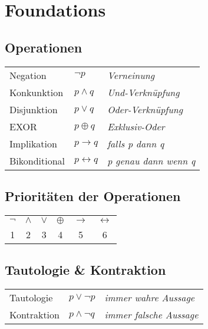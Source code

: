 \section{Foundations}

\subsection{Operationen}
\begin{tabular}{lll}
	Negation & $\neg p$ & \textit{Verneinung} \\ 
	Konkunktion & $p \wedge q$ & \textit{Und-Verknüpfung} \\ 
	Disjunktion & $p \vee q$ & \textit{Oder-Verknüpfung} \\
	EXOR & $p \oplus q$ & \textit{Exklusiv-Oder} \\
	Implikation & $p \rightarrow q$ & \textit{falls p dann q} \\
	Bikonditional & $p \leftrightarrow q$ & \textit{p genau dann wenn q} \\
\end{tabular} 

\subsection{Prioritäten der Operationen}
\begin{tabular}{cccccc}
	$\neg$ & $\wedge$ & $\vee$ & $\oplus$ & $\rightarrow$ & $\leftrightarrow$ \\
	1 & 2 & 3 & 4 & 5 & 6
\end{tabular} 

\subsection{Tautologie \& Kontraktion}
\begin{tabular}{lll}
	Tautologie & $p \vee \neg p$ & \textit{immer wahre Aussage} \\ 
	Kontraktion & $p \wedge \neg q$ & \textit{immer falsche Aussage} \\ 
\end{tabular} 

